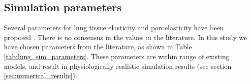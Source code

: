 \subsection{Simulation parameters}
\label{sec:sim_params}
Several parameters for lung tissue elasticity and poroelasticity have been proposed \cite{zhang2004technical,werner2009patient,lande2006analysis,owen2001mechanics,de1981model}. There is no consensus in the values in the literature. In this study we have chosen parameters from the literature, as shown in Table \ref{tab:lung_sim_parameters}. These parameters are within range of existing models, and result in physiologically realistic simulation results (see section \ref{sec:numerical_results}).
%
\begin{table}[H]
\begin{center}
\end{center}
\caption{Parameters for breathing simulations.}
\label{tab:lung_sim_parameters}
\end{table}
